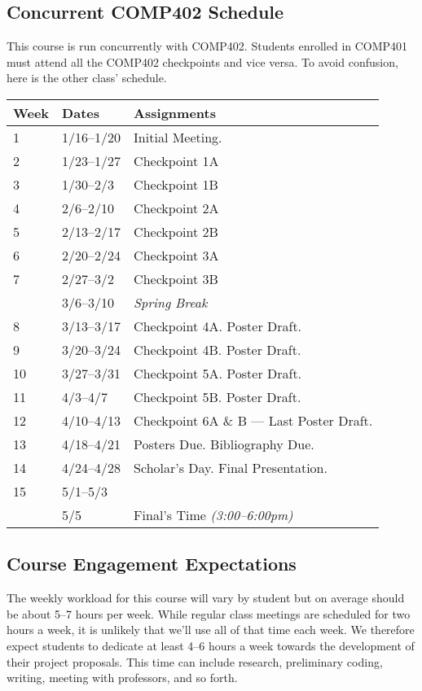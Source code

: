 \documentclass[10pt]{article}
\begin{document}
\subsection{Concurrent COMP402 Schedule}

This course is run concurrently with COMP402. Students enrolled in COMP401 must attend all the COMP402 checkpoints and vice versa. To avoid confusion, here is the other class' schedule.

\begin{center}
\begin{tabular}{lll}
Week & Dates & Assignments \\ \toprule
1 & 1/16--1/20 &  Initial Meeting.  \\
2 & 1/23--1/27 & Checkpoint 1A \\
3 & 1/30--2/3 & Checkpoint 1B \\
4 & 2/6--2/10 & Checkpoint 2A \\
5 & 2/13--2/17 & Checkpoint 2B \\
6 & 2/20--2/24 & Checkpoint 3A  \\
7 & 2/27--3/2 & Checkpoint 3B \\
 & 3/6--3/10 & \textit{Spring Break} \\
8 & 3/13--3/17  & Checkpoint 4A. Poster Draft. \\
9 & 3/20--3/24 & Checkpoint 4B. Poster Draft.   \\
10 & 3/27--3/31 & Checkpoint 5A. Poster Draft. \\
11 & 4/3--4/7 &  Checkpoint 5B. Poster Draft. \\
12 & 4/10--4/13 & Checkpoint 6A \& B --- Last Poster Draft. \\
13 & 4/18--4/21 & Posters Due. Bibliography Due.  \\
14 & 4/24--4/28 & Scholar's Day. Final Presentation. \\
15 & 5/1--5/3 &   \\ \midrule
  & 5/5 & Final's Time \textit{(3:00--6:00pm)}  \\
\end{tabular}
\end{center}


\subsection{Course Engagement Expectations}

The weekly workload for this course will vary by student but on average should be about 5--7 hours per week.  While regular class meetings are scheduled for two hours a week, it is unlikely that we'll use all of that time each week.  We therefore expect students to dedicate at least 4--6 hours a week towards the development of their project proposals.  This time can include research, preliminary coding, writing, meeting with professors, and so forth.
\end{document}
